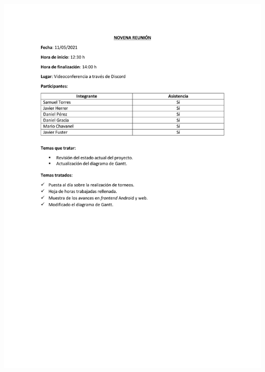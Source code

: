 \documentclass{article}
\begin{document}
\includegraphics[width=\textwidth]{../images/actas/Acta_reunion_9.pdf}
\end{document}
